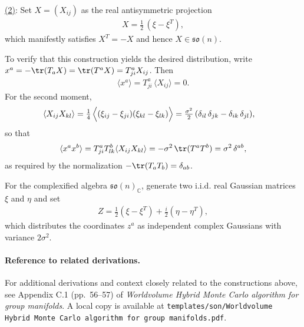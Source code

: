 \noindent\underline{(2)}: Set $X = (X_{ij})$ as the real antisymmetric projection
\begin{align}
  X = \tfrac{1}{2}\,(\xi - \xi^T),
\end{align}
which manifestly satisfies $X^T = -X$ and hence $X \in \mathfrak{so}(n)$.

To verify that this construction yields the desired distribution, write $x^a = -\tr (T_a X) = \tr (T^a X) = T^a_{ji} X_{ij}$. Then
\begin{align}
  \langle x^a \rangle = T^a_{ji}\,\langle X_{ij} \rangle = 0.
\end{align}
For the second moment,
\begin{align}
  \langle X_{ij} X_{kl} \rangle
  &= \tfrac{1}{4}\,\Bigl\langle (\xi_{ij} - \xi_{ji})(\xi_{kl} - \xi_{lk}) \Bigr\rangle
   = \tfrac{\sigma^2}{2}\,(\delta_{il}\,\delta_{jk} - \delta_{ik}\,\delta_{jl}),
\end{align}
so that
\begin{align}
  \langle x^a x^b \rangle = T^a_{ji} T^b_{lk} \langle X_{ij} X_{kl} \rangle
  = -\sigma^2\,\tr (T^a T^b) = \sigma^2\,\delta^{ab},
\end{align}
as required by the normalization $-\tr(T_a T_b)=\delta_{ab}$.

For the complexified algebra $\mathfrak{so}(n)_\mathbb{C}$, generate two i.i.d. real Gaussian matrices $\xi$ and $\eta$ and set
\begin{align}
  Z = \tfrac{1}{2}(\xi - \xi^T) + \tfrac{i}{2}(\eta - \eta^T),
\end{align}
which distributes the coordinates $z^a$ as independent complex Gaussians with variance $2\sigma^2$.


\paragraph{Reference to related derivations.}
For additional derivations and context closely related to the constructions above, see Appendix C.1 (pp.~56--57) of \textit{Worldvolume Hybrid Monte Carlo algorithm for group manifolds}. A local copy is available at
\texttt{templates/son/Worldvolume Hybrid Monte Carlo algorithm for group manifolds.pdf}.



